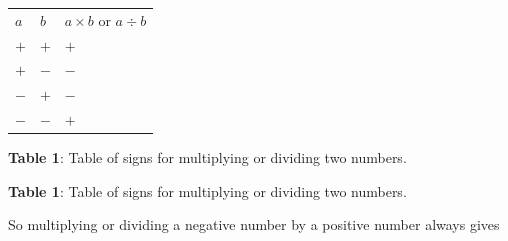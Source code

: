           \begin{table}
        \begin{center}
      \label{m38346*uid24}
    \noindent
      \tablelasttail{}
      \begin{xtabular}[t]{|l|l|l|}\hline
                  $a$
                 &
                  $b$
                 &
        $a\ensuremath{\times}b$ or $a÷b$%
     \tabularnewline{}
                  $+$
                 &
                  $+$
                 &
                  $+$
     \tabularnewline{}
                  $+$
                 &
                  $-$
                 &
                  $-$
     \tabularnewline{}
                  $-$
                 &
                  $+$
                 &
                  $-$
     \tabularnewline{}
                  $-$
                 &
                  $-$
                 &
                  $+$
     \tabularnewline{}
    \end{xtabular}
      \end{center}
    \begin{center}{\small\bfseries Table 1}: Table of signs for multiplying or dividing two numbers.\end{center}
    \begin{caption}{\small\bfseries Table 1}: Table of signs for multiplying or dividing two numbers.\end{caption}
\end{table}
    \par
        \label{m38346*id174425}So multiplying or dividing a negative number by a positive number always gives
